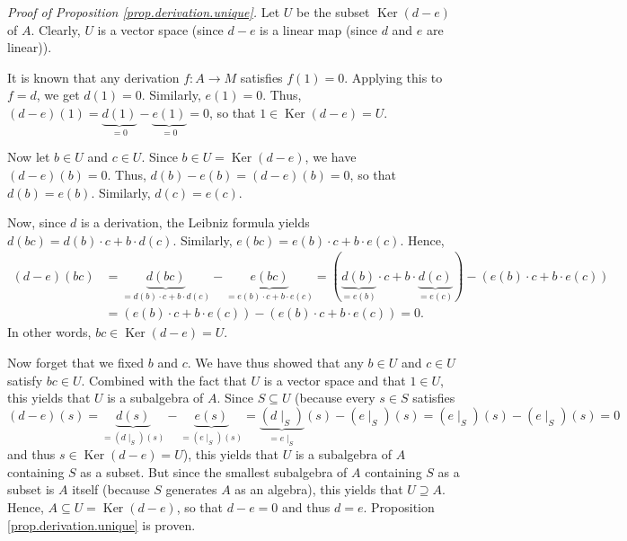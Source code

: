 \documentclass[etingof-lie.tex]{subfiles}
\begin{document}
\textit{Proof of Proposition \ref{prop.derivation.unique}.} Let $U$ be the
subset $\operatorname*{Ker}\left(  d-e\right)  $ of $A$. Clearly, $U$ is a
vector space (since $d-e$ is a linear map (since $d$ and $e$ are linear)).

It is known that any derivation $f:A\rightarrow M$ satisfies $f\left(
1\right)  =0$. Applying this to $f=d$, we get $d\left(  1\right)  =0$.
Similarly, $e\left(  1\right)  =0$. Thus, $\left(  d-e\right)  \left(
1\right)  =\underbrace{d\left(  1\right)  }_{=0}-\underbrace{e\left(
1\right)  }_{=0}=0$, so that $1\in\operatorname*{Ker}\left(  d-e\right)  =U$.

Now let $b\in U$ and $c\in U$. Since $b\in U=\operatorname*{Ker}\left(
d-e\right)  $, we have $\left(  d-e\right)  \left(  b\right)  =0$. Thus,
$d\left(  b\right)  -e\left(  b\right)  =\left(  d-e\right)  \left(  b\right)
=0$, so that $d\left(  b\right)  =e\left(  b\right)  $. Similarly, $d\left(
c\right)  =e\left(  c\right)  $.

Now, since $d$ is a derivation, the Leibniz formula yields $d\left(
bc\right)  =d\left(  b\right)  \cdot c+b\cdot d\left(  c\right)  $. Similarly,
$e\left(  bc\right)  =e\left(  b\right)  \cdot c+b\cdot e\left(  c\right)  $.
Hence,%
\begin{align*}
\left(  d-e\right)  \left(  bc\right)   &  =\underbrace{d\left(  bc\right)
}_{=d\left(  b\right)  \cdot c+b\cdot d\left(  c\right)  }%
-\underbrace{e\left(  bc\right)  }_{=e\left(  b\right)  \cdot c+b\cdot
e\left(  c\right)  }=\left(  \underbrace{d\left(  b\right)  }_{=e\left(
b\right)  }\cdot c+b\cdot\underbrace{d\left(  c\right)  }_{=e\left(  c\right)
}\right)  -\left(  e\left(  b\right)  \cdot c+b\cdot e\left(  c\right)
\right) \\
&  =\left(  e\left(  b\right)  \cdot c+b\cdot e\left(  c\right)  \right)
-\left(  e\left(  b\right)  \cdot c+b\cdot e\left(  c\right)  \right)  =0.
\end{align*}
In other words, $bc\in\operatorname*{Ker}\left(  d-e\right)  =U$.

Now forget that we fixed $b$ and $c$. We have thus showed that any $b\in U$
and $c\in U$ satisfy $bc\in U$. Combined with the fact that $U$ is a vector
space and that $1\in U$, this yields that $U$ is a subalgebra of $A$. Since
$S\subseteq U$ (because every $s\in S$ satisfies%
\[
\left(  d-e\right)  \left(  s\right)  =\underbrace{d\left(  s\right)
}_{=\left(  d\mid_{S}\right)  \left(  s\right)  }-\underbrace{e\left(
s\right)  }_{=\left(  e\mid_{S}\right)  \left(  s\right)  }%
=\underbrace{\left(  d\mid_{S}\right)  }_{=e\mid_{S}}\left(  s\right)
-\left(  e\mid_{S}\right)  \left(  s\right)  =\left(  e\mid_{S}\right)
\left(  s\right)  -\left(  e\mid_{S}\right)  \left(  s\right)  =0
\]
and thus $s\in\operatorname*{Ker}\left(  d-e\right)  =U$), this yields that
$U$ is a subalgebra of $A$ containing $S$ as a subset. But since the smallest
subalgebra of $A$ containing $S$ as a subset is $A$ itself (because $S$
generates $A$ as an algebra), this yields that $U\supseteq A$. Hence,
$A\subseteq U=\operatorname*{Ker}\left(  d-e\right)  $, so that $d-e=0$ and
thus $d=e$. Proposition \ref{prop.derivation.unique} is proven.
\end{document}
